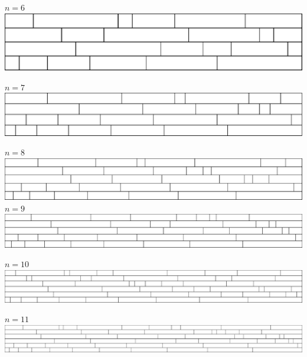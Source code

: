 \documentclass[a4paper, notitlepage, 12pt]{scrartcl}
\begin{document}
\begin{center}
$n = 6$\\
\includegraphics[scale=.5]{../Bwinf-Aufgabe1-KunstDerFuge/visualisierung/mauer-6.pdf}
\par\vspace{1em}
\newpage
$n = 7$\\
\includegraphics[width=\textwidth]{../Bwinf-Aufgabe1-KunstDerFuge/visualisierung/mauer-7.pdf}
\par\vspace{1em}
$n = 8$\\
\includegraphics[width=\textwidth]{../Bwinf-Aufgabe1-KunstDerFuge/visualisierung/mauer-8.pdf}
$n = 9$\\
\includegraphics[width=\textwidth]{../Bwinf-Aufgabe1-KunstDerFuge/visualisierung/mauer-9.pdf}
\par\vspace{1em}
$n = 10$\\
\includegraphics[width=\textwidth]{../Bwinf-Aufgabe1-KunstDerFuge/visualisierung/mauer-10.pdf}
\par\vspace{1em}
$n = 11$\\
\includegraphics[width=\textwidth]{../Bwinf-Aufgabe1-KunstDerFuge/visualisierung/mauer-11.pdf}

\end{center}
\end{document}
